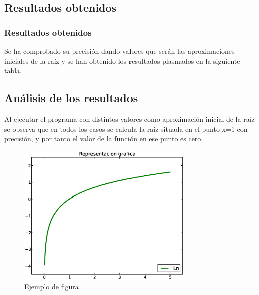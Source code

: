 \documentclass{beamer}
\begin{document}
\subsection{Resultados obtenidos}

\begin{frame}
\frametitle{Resultados obtenidos}
Se ha comprobado su precisión dando valores que serán las aproximaciones iniciales de la raíz y se han obtenido los resultados plasmados en la siguiente tabla.



\end{frame}

\subsection{Análisis de los resultados}
\begin{frame}
Al ejecutar el programa con distintos valores como aproximación inicial de la raíz se observa que en todos los casos se calcula la raíz situada en el punto x=1 con precisión, y por tanto el valor de la función en ese punto es cero.
\begin{figure}[!th]

\begin{center}

\includegraphics[width=0.75\textwidth]{images/ln-1.eps}

\caption{Ejemplo de figura}

\label{fig:1}

\end{center}

\end{figure}
\end{frame}
\end{document}
